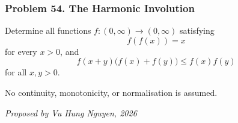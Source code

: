 \subsubsection*{Problem 54. The Harmonic Involution}

\begin{exercisebox}[medium]

Determine all functions $f:(0,\infty)\to(0,\infty)$ satisfying
\[
\boxed{\qquad f(f(x))=x\qquad}
\]
for every $x>0$, and
\[
\boxed{\qquad
f(x+y)\bigl(f(x)+f(y)\bigr)\le f(x)f(y)
\qquad}
\]
for all $x,y>0$.

No continuity, monotonicity, or normalisation is assumed.

\begin{flushright}
\textit{Proposed by Vu Hung Nguyen, 2026}
\end{flushright}


\end{exercisebox}
